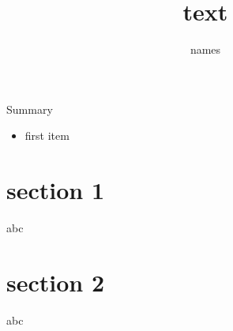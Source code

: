 \documentclass{beamer}
\author{names}
\title{text}
\begin{document}
\begin{frame}[plain]
    \titlepage
    \tableofcontents

    {Summary}

    \begin{itemize}
        \item first item
    \end{itemize}
\end{frame}

\section{section 1}
\begin{frame}
    abc
\end{frame} 

\section{section 2}
\begin{frame}
    abc
\end{frame} 
\end{document}
